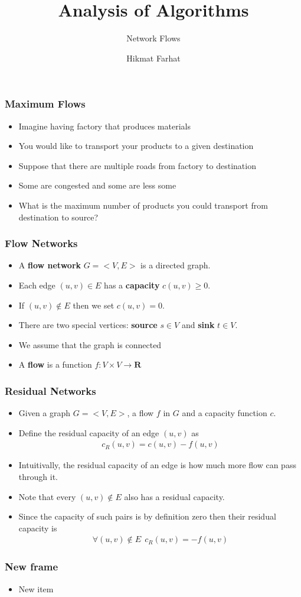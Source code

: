 \documentclass{beamer}
\title{ Analysis of Algorithms}
\subtitle{Network Flows}
\author{Hikmat Farhat}
\begin{document}
\frame{\titlepage}

\begin{frame}
  \frametitle{Maximum Flows}
\begin{itemize}
  \item Imagine having factory that produces materials
  \item You would like to transport your products to a given destination
  \item Suppose that there are multiple roads from factory to destination
  \item Some are congested and some are less some
  \item What is the maximum number of products you could transport from destination to source?
\end{itemize}
  

\end{frame}  
\begin{frame}
  \frametitle{Flow Networks}
\begin{itemize}
  \item A \textbf{flow network} $G=<V,E>$ is a directed graph.
  \item Each edge $(u,v)\in E$ has a \textbf{capacity} $c(u,v)\ge 0$.
  \item If $(u,v)\notin E$ then we set $c(u,v)=0$.
  \item There are two special vertices: \textbf{source} $s\in V$ and \textbf{sink} $t\in V$.
  \item We assume that the graph is connected
  \item A \textbf{flow} is a function $f:V\times V\rightarrow \mathbf{R}$
\end{itemize}
  

\end{frame}
\begin{frame}
  \frametitle{Residual Networks}

  \begin{itemize}
    \item Given a graph $G=<V,E>$, a flow $f$ in $G$ and a capacity function $c$.
    \item Define the residual capacity of an edge $(u,v)$ as
    \begin{align*}
      c_R(u,v)=c(u,v)-f(u,v)
    \end{align*} 
    \item Intuitivally, the residual capacity of an edge is how much more flow can pass through it.
    \item Note that every $(u,v)\notin E$ also has a residual capacity.
    \item Since the capacity of such pairs is by definition zero then their residual capacity is 
    \begin{align*}
      \forall (u,v)\notin E\ \ c_R(u,v)=-f(u,v)
    \end{align*} 
  \end{itemize}

\end{frame}
\begin{frame}
  \frametitle{New frame}

  \begin{itemize}
    \item New item
  \end{itemize}

\end{frame}
\end{document}
